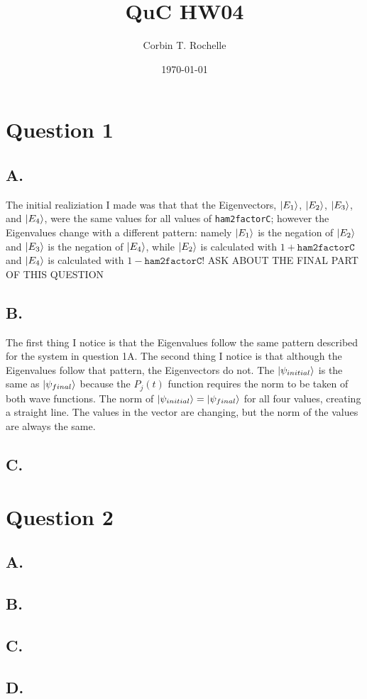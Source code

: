 \documentclass[12pt]{article}
\author{Corbin T. Rochelle}
\title{QuC HW04}
\date{\today}
\begin{document}
\maketitle

\section*{Question 1}
\subsection*{A.}
The initial realiziation I made was that that the Eigenvectors, $\ket{E_1}$, $\ket{E_2}$, $\ket{E_3}$, and $\ket{E_4}$, were the same values for all values of \texttt{ham2factorC};
however the Eigenvalues change with a different pattern: namely $\ket{E_1}$ is the negation of $\ket{E_2}$ and $\ket{E_3}$ is the negation of $\ket{E_4}$, while $\ket{E_2}$ is calculated with $1+\texttt{ham2factorC}$ and $\ket{E_4}$ is calculated with $1-\texttt{ham2factorC}$!
ASK ABOUT THE FINAL PART OF THIS QUESTION
\subsection*{B.}
The first thing I notice is that the Eigenvalues follow the same pattern described for the system in question 1A. 
The second thing I notice is that although the Eigenvalues follow that pattern, the Eigenvectors do not. 
The $\ket{\psi_{initial}}$ is the same as $\ket{\psi_{final}}$ because the $P_j(t)$ function requires the norm to be taken of both wave functions. 
The norm of $\ket{\psi_{initial}}=\ket{\psi_{final}}$ for all four values, creating a straight line.
The values in the vector are changing, but the norm of the values are always the same. 
\subsection*{C.}


\section*{Question 2}
\subsection*{A.}
\subsection*{B.}
\subsection*{C.}
\subsection*{D.}
\end{document}

